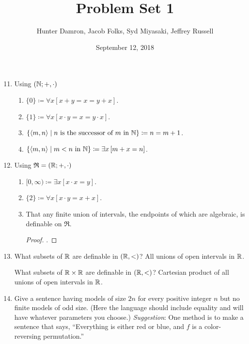 \documentclass{homework}
\title{Problem Set 1}
\author{Hunter Damron, Jacob Folks, Syd Miyasaki, Jeffrey Russell}
\date{September 12, 2018}
\begin{document}
	\maketitle
	\begin{enumerate}
		\setcounter{enumi}{10}
		\item Using $(\mathbb{N}; +, \cdot)$
		\begin{enumerate}
			\item $\{0\} \coloneqq \forall x \left[x + y = x = y + x\right]$.
			\item $\{1\} \coloneqq \forall x \left[x \cdot y = x = y \cdot x \right]$.
			\item $\{\langle m,n \rangle \mid n \text{ is the successor of } m \text{ in } \mathbb{N}\} \coloneqq n = m + 1$.
			\item $\{\langle m,n \rangle \mid m < n \text{ in } \mathbb{N}\} \coloneqq \exists x \left[m + x = n\right]$.
		\end{enumerate}
		\item Using $\mathfrak{R} = (\mathbb{R}; +, \cdot)$
		\begin{enumerate}
			\item $[0, \infty) \coloneqq \exists x \left[x \cdot x = y\right]$.
			\item $\{2\} \coloneqq \forall x [x \cdot y = x + x]$.
			\item That any finite union of intervals, the endpoints of which are algebraic, is definable on $\mathfrak{R}$.
			\begin{proof}
				\TODO.
			\end{proof}
		\end{enumerate}
		
		\setcounter{enumi}{13}
		\item What subsets of $\mathbb{R}$ are definable in $(\mathbb{R}, <)$? All unions of open intervals in $\mathbb{R}$. \par %
		What subsets of $\mathbb{R}\times\mathbb{R}$ are definable in $(\mathbb{R}, <)$? Cartesian product of all unions of open intervals in $\mathbb{R}$. %
		
		\setcounter{enumi}{15}
		\item Give a sentence having models of size $2n$ for every positive integer $n$ but no finite models of odd size. (Here the language should include equality and will have whatever parameters you choose.) \emph{Suggestion}: One method is to make a sentence that says, ``Everything is either red or blue, and $f$ is a color-reversing permutation.''
		
		\TODO
	\end{enumerate}
\end{document}
